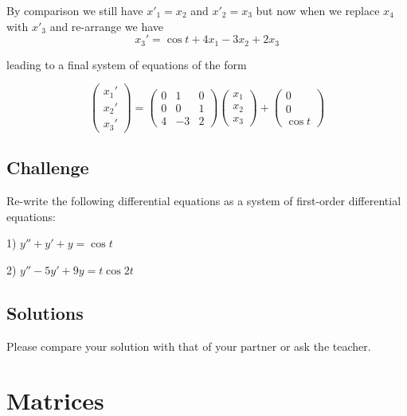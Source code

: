 By comparison we still have $x'_1 = x_2$ and $x'_2 = x_3$ but now when we replace $x_4$ with $x'_3$ and re-arrange we have
\begin{equation}
   x_3' = \cos t + 4 x_1 - 3 x_2 + 2 x_3
\end{equation}

leading to a final system of equations of the form

\begin{equation}
    \left(
        \begin{array}{c}
            x_1' \\
            x_2' \\
            x_3'
        \end{array}
    \right)
    =
    \left(
        \begin{array}{ccc}
            0 & 1 & 0 \\
            0 & 0 & 1 \\
            4 & -3 & 2
        \end{array}
    \right)
    \left(
        \begin{array}{c}
            x_1 \\
            x_2 \\
            x_3
        \end{array}
    \right)
    +
    \left(
        \begin{array}{c}
            0 \\
            0 \\
            \cos t
        \end{array}
    \right)
\end{equation}

\subsection*{Challenge}
Re-write the following differential equations as a system of first-order differential equations:

1) $y'' + y' + y = \cos t$

2) $y'' - 5 y' + 9 y = t \cos 2t$

\subsection*{Solutions}
Please compare your solution with that of your partner or ask the teacher.


\iffalse
\newpage
%
\section{Matrices}

